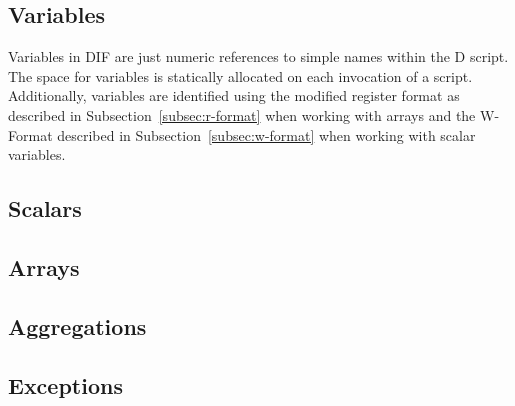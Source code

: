 




\subsection{Variables}
\label{sec:vars}

Variables in DIF are just numeric references to simple names within the D script.
The space for variables is statically allocated on each invocation of a script.
Additionally, variables are identified using the modified register format as described
in Subsection~\ref{subsec:r-format} when working with arrays and the W-Format described
in Subsection~\ref{subsec:w-format} when working with scalar variables.

\subsection{Scalars}
\label{sec:scalars}

\subsection{Arrays}
\label{sec:arrays}

\subsection{Aggregations}
\label{sec:aggregations}

\subsection{Exceptions}
\label{sec:exceptions}

